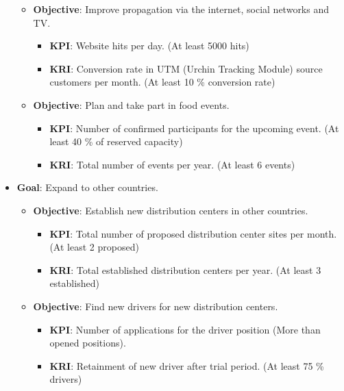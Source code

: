 \documentclass[11pt,a4paper]{article}
\begin{document}
\begin{itemize}
    \begin{itemize}
        \item \textbf{Objective}: Improve propagation via the internet, social networks and TV.
        \begin{itemize}
            \item \textbf{KPI}: Website hits per day. (At least 5000 hits)
            \item \textbf{KRI}: Conversion rate in UTM (Urchin Tracking Module) source customers per month. (At least 10 \% conversion rate)
        \end{itemize}
        \item \textbf{Objective}: Plan and take part in food events.
        \begin{itemize}
            \item \textbf{KPI}: Number of confirmed participants for the upcoming event. (At least 40 \% of reserved capacity)
            \item \textbf{KRI}: Total number of events per year. (At least 6 events)
        \end{itemize}
    \end{itemize}
    \item \textbf{Goal}: Expand to other countries.
    \begin{itemize}
        \item \textbf{Objective}: Establish new distribution centers in other countries.
        \begin{itemize}
            \item \textbf{KPI}: Total number of proposed distribution center sites per month. (At least 2 proposed)
            \item \textbf{KRI}: Total established distribution centers per year. (At least 3 established)
        \end{itemize}
        \item \textbf{Objective}: Find new drivers for new distribution centers.
        \begin{itemize}
            \item \textbf{KPI}: Number of applications for the driver position (More than opened positions).
            \item \textbf{KRI}: Retainment of new driver after trial period. (At least 75 \% drivers)
        \end{itemize}
    \end{itemize}
\end{itemize}
\end{document}
